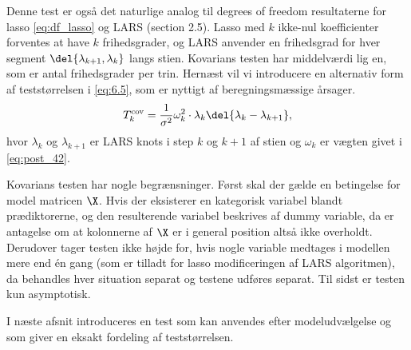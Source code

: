 Denne test er også det naturlige analog til degrees of freedom resultaterne for lasso \eqref{eq:df_lasso} og LARS (section 2.5).
Lasso med \(k\) ikke-nul koefficienter forventes at have \(k\) frihedsgrader, og LARS anvender en frihedsgrad for hver segment \(\del{\lambda_{k+1}, \lambda_k}\) langs stien.
Kovarians testen har middelværdi lig en, som er antal frihedsgrader per trin.
%
Hernæst vil vi introducere en alternativ form af teststørrelsen i \eqref{eq:6.5}, som er nyttigt af beregningsmæssige årsager.
\begin{align*}
T_k^\text{cov} = \frac{1}{\sigma^2} \omega_k^2 \cdot \lambda_k \del{\lambda_k - \lambda_{k+1}},
\end{align*}
hvor \(\lambda_k\) og \(\lambda_{k+1}\) er LARS knots i step \(k\) og \(k+1\) af stien og \(\omega_k\) er vægten givet i \eqref{eq:post_42}.


%


Kovarians testen har nogle begrænsninger.
Først skal der gælde en betingelse for model matricen \(\X\).
Hvis der eksisterer en kategorisk variabel blandt prædiktorerne, og den resulterende variabel beskrives af dummy variable, da er antagelse om at kolonnerne af \(\X\) er i general position altså ikke overholdt.
Derudover tager testen ikke højde for, hvis nogle variable medtages i modellen mere end én gang (som er tilladt for lasso modificeringen af LARS algoritmen), da behandles hver situation separat og testene udføres separat.
Til sidst er testen kun asymptotisk.

I næste afsnit introduceres en test som kan anvendes efter modeludvælgelse og som giver en eksakt fordeling af teststørrelsen.